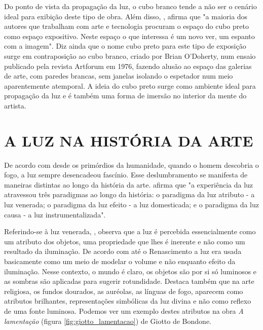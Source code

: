 Do ponto de vista da propagação da luz, o cubo branco tende a não ser o cenário ideal para exibição deste tipo de obra. Além disso, , afirma que "a maioria dos autores que trabalham com arte e tecnologia procuram o espaço do cubo preto como espaço expositivo. Neste espaço o que interessa é um novo ver, um espanto com a imagem". Diz ainda que o nome cubo preto para este tipo de exposição surge em contraposição ao cubo branco, criado por Brian O'Doherty, num ensaio publicado pela revista Artforum em 1976, fazendo alusão ao espaço das galerias de arte, com paredes brancas, sem janelas isolando o espetador num meio aparentemente atemporal. A ideia do cubo preto surge como ambiente ideal para propagação da luz e é também uma forma de imersão no interior da mente do artista.


\section{A LUZ NA HISTÓRIA DA ARTE}

De acordo com   desde os primórdios da humanidade, quando o homem descobria o fogo, a luz sempre desencadeou fascínio. Esse deslumbramento se manifesta de maneiras distintas ao longo da história da arte.  afirma que "a experiência da luz atravessou três paradigmas ao longo da história: o paradigma da luz atributo - a luz venerada; o paradigma da luz efeito - a luz domesticada; e o paradigma da luz causa - a luz instrumentalizada".

Referindo-se à luz venerada, , observa que a luz é percebida essencialmente como um atributo dos objetos, uma propriedade que lhes é inerente e não como um resultado da iluminação. De acordo com  até o Renascimento a luz era usada basicamente como um meio de modelar o volume e não enquanto efeito da iluminação. Nesse contexto, o mundo é claro, os objetos são por si só luminosos e as sombras são aplicadas para sugerir rotundidade. Destaca também que na arte religiosa, os fundos dourados, as auréolas, as línguas de fogo, aparecem como atributos brilhantes, representações simbólicas da luz divina e não como reflexo de uma fonte luminosa. Podemos ver um exemplo destes atributos na obra \textit{A lamentação} (figura \ref{fig:giotto_lamentacao}) de Giotto de Bondone.

